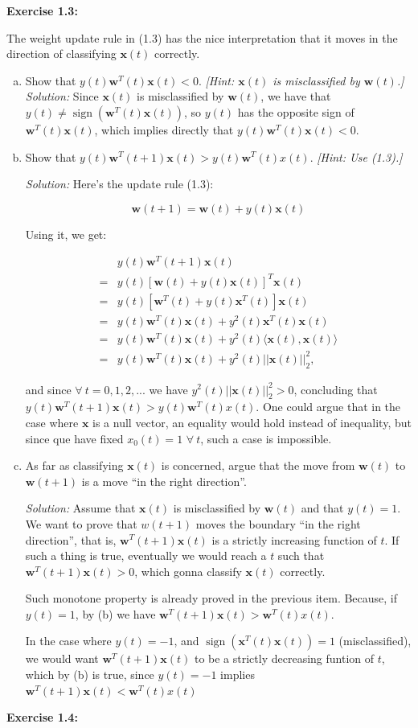 \documentclass[12pt,letterpaper]{article}
\newcommand{\bx}{\boldsymbol{x}}
\newcommand{\bw}{\boldsymbol{w}}
\newcommand{\sign}{\operatorname{sign}}
\begin{document}
	\textbf{Exercise 1.3:}\cite{yaser2012learning} 
	
	The weight update rule in (1.3) has the nice interpretation that it moves in the direction of classifying $\bx(t)$ correctly. 
	\begin{enumerate}[(a)]
		\item Show that $y(t)\bw^{T}(t)\bx(t)<0.$ \emph{[Hint: $\bx(t)$ is misclassified by $\bw(t)$.]}
		\subitem \textit{Solution:}
		Since $\bx(t)$ is misclassified by $\bw(t)$, we have that $y(t)\neq\sign(\bw^{T}(t)\bx(t))$, so $y(t)$ has the opposite sign of $\bw^{T}(t)\bx(t)$, which implies directly that $y(t)\bw^{T}(t)\bx(t)<0.$
		
		\item Show that $y(t)\bw^{T}(t+1)\bx(t)>y(t)\bw^{T}(t)x(t)$. \emph{[Hint: Use (1.3).]}
		
		\subitem \textit{Solution:}
			Here's the update rule (1.3): 
			
			$$\bw(t+1)=\bw(t)+y(t)\bx(t)$$
			
			Using it, we get:
			
			\begin{align*}
				 &y(t)\bw^{T}(t+1)\bx(t)\\
				=&y(t)[\bw(t)+y(t)\bx(t)]^{T}\bx(t)\\
				=&y(t)[\bw^{T}(t)+y(t)\bx^{T}(t)]\bx(t)\\
				=&y(t)\bw^{T}(t)\bx(t)+y^2(t)\bx^{T}(t)\bx(t)\\
				=&y(t)\bw^{T}(t)\bx(t)+y^2(t)\langle\bx(t),\bx(t)\rangle\\
				=&y(t)\bw^{T}(t)\bx(t)+y^2(t)||\bx(t)||_2^2,
			\end{align*}
			
			and since $\forall ~t=0,1,2,...$ we have $y^2(t)||\bx(t)||_2^2>0$, concluding that $y(t)\bw^{T}(t+1)\bx(t)>y(t)\bw^{T}(t)x(t)$. One could argue that in the case where $\bx$ is a null vector, an equality would hold instead of inequality, but since que have fixed $x_0(t)=1$ $\forall ~t$, such a case is impossible.
		
		\item As far as classifying $\bx(t)$ is concerned, argue that the move from $\bw(t)$ to $\bw(t+1)$ is a move ``in the right direction''.
		
		\subitem \textit{Solution:} Assume that $\bx(t)$ is misclassified by $\bw(t)$ and that $y(t)=1$. We want to prove that $w(t+1)$ moves the boundary ``in the right direction'', that is, $\bw^{T}(t+1)\bx(t)$ is a strictly increasing function of $t$. If such a thing is true, eventually we would reach a $t$ such that $\bw^{T}(t+1)\bx(t)>0$, which gonna classify $\bx(t)$ correctly.
		
		Such monotone property is already proved in the previous item. Because, if $y(t)=1$, by (b) we have $\bw^{T}(t+1)\bx(t)>\bw^{T}(t)x(t)$.
		
		In the case where $y(t)=-1$, and $\sign(\bx^{T}(t)\bx(t))=1$ (misclassified), we would want $\bw^{T}(t+1)\bx(t)$ to be a strictly decreasing funtion of $t$, which by (b) is true, since $y(t)=-1$ implies $\bw^{T}(t+1)\bx(t)<\bw^{T}(t)x(t)$
	\end{enumerate}
		\textbf{Exercise 1.4:}
		
\end{document}
